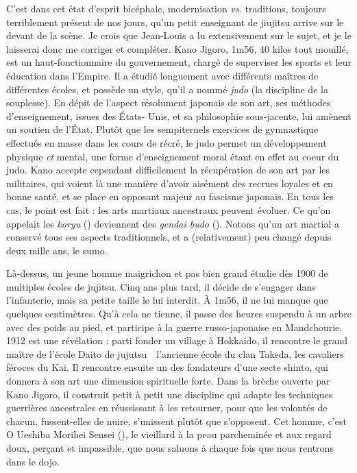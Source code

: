 C'est dans cet état d'esprit bicéphale, modernisation \emph{vs.} traditions,
toujours terriblement présent de nos jours, qu'un petit enseignant de jiujitsu
arrive sur le devant de la scène. Je crois que Jean-Louis a lu extensivement
sur le sujet, et je le laisserai donc me corriger et compléter. Kano Jigoro,
1m56, 40 kilos tout mouillé, est un haut-fonctionnaire du gouvernement, chargé
de superviser les sports et leur éducation dans l'Empire. Il a étudié
longuement avec différents maîtres de différentes écoles, et possède un style,
qu'il a nommé \emph{judo} (la discipline de la souplesse). En dépit de
l'aspect résolument japonais de son art, ses méthodes d'enseignement, issues
des États- Unis, et sa philosophie sous-jacente, lui amènent un soutien de
l'État. Plutôt que les sempiternels exercices de gymnastique effectués en
masse dans les cours de récré, le judo permet un développement physique
\emph{et} mental, une forme d'enseignement moral étant en effet au coeur du
judo. Kano accepte cependant difficilement la récupération de son art par les
militaires, qui voient là une manière d'avoir aisément des recrues loyales et
en bonne santé, et se place en opposant majeur au fascisme japonais. En tous
les cas, le point est fait : les arts martiaux ancestraux peuvent évoluer. Ce
qu'on appelait les \emph{koryu} () deviennent des
\emph{gendai budo} (). Notons qu'un art martial a
conservé tous ses aspects traditionnels, et a (relativement) peu changé depuis
deux mille ans, le sumo.

Là-dessus, un jeune homme maigrichon et pas bien grand étudie dès 1900 de
multiples écoles de jujitsu. Cinq ans plus tard, il décide de s'engager dans
l'infanterie, mais sa petite taille le lui interdit. À 1m56, il ne lui manque
que quelques centimètres. Qu'à cela ne tienne, il passe des heures suspendu à
un arbre avec des poids au pied, et participe à la guerre russo-japonaise en
Mandchourie. 1912 est une révélation : parti fonder un village à Hokkaido, il
rencontre le grand maître de l'école Daito de jujutsu~\incise~l'ancienne école
du clan Takeda, les cavaliers féroces du Kai. Il rencontre ensuite un des
fondateurs d'une secte shinto, qui donnera à son art une dimension spirituelle
forte. Dans la brèche ouverte par Kano Jigoro, il construit petit à petit une
discipline qui adapte les techniques guerrières ancestrales en réussissant à
les retourner, pour que les volontés de chacun, fussent-elles de nuire,
s'unissent plutôt que s'opposent. Cet homme, c'est O Ueshiba Morihei Sensei
(), le vieillard à la peau
parcheminée et aux regard doux, perçant et impassible, que nous saluons à
chaque fois que nous rentrons dans le dojo.
